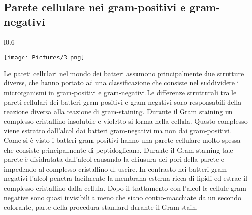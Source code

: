 \subsection{Parete cellulare nei gram-positivi e gram-negativi}
\begin{wrapfigure}{l}{0.6\textwidth}
  \begin{center}
    \texttt{[image: Pictures/3.png]}
  \end{center}
\end{wrapfigure}
Le pareti cellulari nel mondo dei batteri assumono principalmente due strutture diverse, che hanno portato ad una classificazione che consiste nel 
suddividere i microrganismi in gram-positivi e gram-negativi.Le differenze strutturali tra le pareti cellulari dei batteri gram-positivi e gram-negativi sono responsabili della reazione diversa alla 
reazione di gram-staining. Durante il  Gram staining un complesso cristallino insolubile e violetto si forma nella cellula. Questo complesso viene estratto dall'alcol dai batteri gram-negativi ma non dai gram-positivi.
Come si \`e visto i batteri gram-positivi hanno una parete cellulare molto spessa che consiste principalmente di peptidoglicano. Durante il Gram-staining tale parete \`e disidratata dall'alcol causando la chiusura dei pori della parete e 
impedendo al complesso cristallino di uscire. In contrasto nei batteri gram-negativi l'alcol penetra facilmente la membrana esterna ricca di lipidi ed estrae il complesso cristallino dalla cellula. Dopo il trattamento con l'alcol le 
cellule gram-negative sono quasi invisibili a meno che siano contro-macchiate da un secondo colorante, parte della procedura standard durante il Gram stain.
